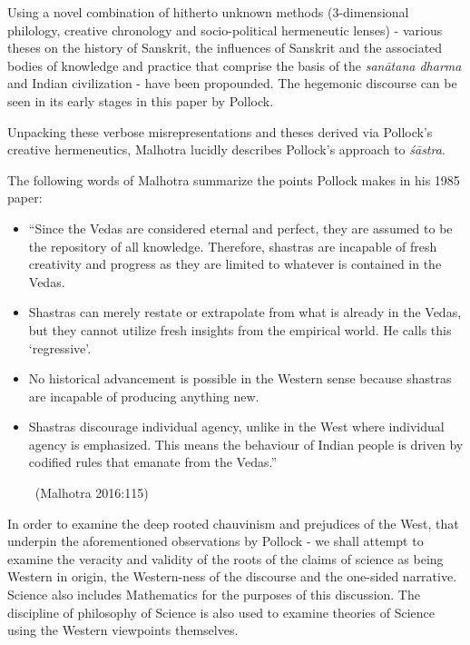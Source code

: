Using a novel combination of hitherto unknown methods (3-dimen\-sion\-al philology, creative chronology and socio-political hermeneutic lenses) - various theses on the history of Sanskrit, the influences of Sanskrit and the associated bodies of knowledge and practice that comprise the basis of the \textit{sanātana dharma} and Indian civilization - have been propounded. The hegemonic discourse can be seen in its early stages in this paper by Pollock.

Unpacking these verbose misrepresentations and theses derived via Pollock’s creative hermeneutics, Malhotra lucidly describes Pollock’s approach to \textit{śāstra}.

The following words of Malhotra summarize the points Pollock makes in his 1985 paper:
\begin{itemize}[topsep=0pt]
\itemsep=0pt
\item “Since the Vedas are considered eternal and perfect, they are assumed to be the repository of all knowledge. Therefore, shastras are incapable of fresh creativity and progress as they are limited to whatever is contained in the Vedas.

 \item Shastras can merely restate or extrapolate from what is already in the Vedas, but they cannot utilize fresh insights from the empirical world. He calls this ‘regressive’.

 \item No historical advancement is possible in the Western sense because shastras are incapable of producing anything new.

 \item Shastras discourage individual agency, unlike in the West where individual agency is emphasized. This means the behaviour of Indian people is driven by codified rules that emanate from the Vedas.”

\vskip -4pt

~\hfill (Malhotra 2016:115)

\end{itemize}

In order to examine the deep rooted chauvinism and prejudices of the West, that underpin the aforementioned observations by Pollock - we shall attempt to examine the veracity and validity of the roots of the claims of science as being Western in origin, the Western-ness of the discourse and the one-sided narrative. Science also includes Mathematics for the purposes of this discussion. The discipline of philosophy of Science is also used to examine theories of Science using the Western viewpoints themselves.

